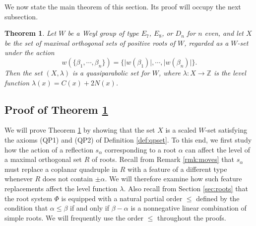 \documentclass[11pt]{amsart}
\theoremstyle{plain}
\newtheorem{theorem}{Theorem}[section]
\theoremstyle{definition}
\theoremstyle{remark}
\numberwithin{equation}{subsection}
\newcommand{\al}{\alpha}
\newcommand{\be}{\beta}
\newcommand{\Z}{{\mathbb Z}}
\newcommand{\abs}[1]{\lvert #1 \rvert}
\begin{document}
We now state the main theorem of this section. Its proof will occupy the next
subsection.


\begin{theorem}\label{thm:qp}
Let $W$ be a Weyl group of type $E_7$, $E_8$, or $D_n$ for $n$ even, and let $X$
be the set of maximal orthogonal sets of positive roots of $W$, regarded as a
$W$-set under the action \[ w(\{\be_1,\cdots,\be_n\})=\{\abs{w(\be_1)}, \cdots,
\abs{w(\be_n)}\}.\] Then the set $(X, \lambda)$ is a quasiparabolic set for $W$,
where $\lambda : X \rightarrow \Z$ is the level function $\lambda(x) = C(x) +
2N(x)$.
\end{theorem}


\subsection{Proof of Theorem \ref{thm:qp}}

\label{sec:proof}
We will prove Theorem \ref{thm:qp} by showing that the set $X$ is a scaled
$W$-set satisfying the axioms (QP1) and (QP2) of Definition \ref{def:qpset}. To
this end, we first study how the action of a reflection $s_\al$ corresponding to
a root $\alpha$ can affect the level of a maximal orthogonal set $R$ of roots.
Recall from Remark \ref{rmk:moves} that $s_\alpha$ must replace a coplanar
quadruple in $R$ with a feature of a different type whenever $R$ does not
contain $\pm\al$. We will therefore examine how such feature replacements affect
the level function $\lambda$. Also recall from Section \ref{sec:roots} that the
root system $\Phi$ is equipped with a natural partial order $\le$ defined by the
condition that $\al\le \beta$ if and only if $\beta-\al$ is a nonnegative linear
combination of simple roots. We will frequently use the order $\le$ throughout
the proofs.
\end{document}
